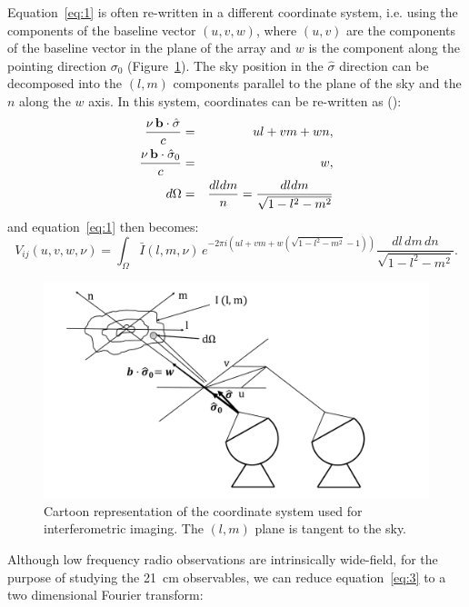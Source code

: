 Equation~\ref{eq:1} is often re-written in a different coordinate system, i.e. using the components of the baseline vector $(u,v,w)$, where $(u,v)$ are the components of the baseline vector in the plane of the array and $w$ is the component along the pointing direction $\sigma_0$ (Figure~\ref{fig:fig1b}). The sky position in the $\hat {\sigma}$ direction can be decomposed into the $(l,m)$ components parallel to the plane of the sky and the $n$ along the $w$ axis. In this system, coordinates can be re-written as (\cite{TMS}):
\begin{eqnarray}
\frac{\nu \, {\bf b} \cdot {\hat {\bf \sigma}}}{c} & = & ul + vm + wn, \nonumber \\
\frac{\nu \, {\bf b} \cdot {\hat {\bf \sigma}}_0}{c} & = & w, \nonumber \\
d\Omega & = & \frac{dl dm}{n} = \frac{dl dm}{\sqrt{1 - l^2 - m^2}}
\label{eq:2.1}
\end{eqnarray}
and equation~\ref{eq:1} then becomes:
\begin{equation}
V_{ij} (u,v,w, \nu) = \int_\Omega {\bar I} (l, m, \nu) \, e^{-2 \pi i (ul + vm + w(\sqrt{1 - l^2 - m^2} - 1))} \frac {dl \, dm \, dn}{\sqrt{1 - l^2 - m^2}}.
\label{eq:3}
\end{equation}
%
\begin{figure}[]
\begin{center}
\includegraphics[width=1.\textwidth]{Bernardi/coordinates_imaging_1}
\end{center}
\caption{Cartoon representation of the coordinate system used for interferometric imaging. The $(l,m)$ plane is tangent to the sky.}
\label{fig:fig1b}
\end{figure}
%
Although low frequency radio observations are intrinsically wide-field, for the purpose of studying the 21~cm observables, we can reduce equation~\ref{eq:3} to a two dimensional Fourier transform:
